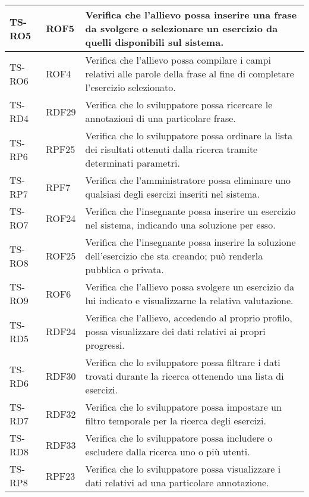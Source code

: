 \begin{longtable}{|>{\centering\arraybackslash}m{1.6cm}|>{\centering\arraybackslash}m{1.7cm}|m{6.41cm}|}
		\\ \hline
		\rowcolor{LightGray}
		TS-RO5		
		& ROF5 
		& Verifica che l'allievo possa inserire una frase da svolgere o selezionare un esercizio da quelli disponibili sul sistema.
		\\ \hline
		TS-RO6		
		& ROF4 
		& Verifica che l'allievo possa compilare i campi relativi alle parole della frase al fine di completare l'esercizio selezionato.
		\\ \hline
		\rowcolor{LightGray}
		TS-RD4		
		& RDF29
		& Verifica che lo sviluppatore possa ricercare le annotazioni di una particolare frase.
		\\ \hline
		TS-RP6		
		& RPF25 
		& Verifica che lo sviluppatore possa ordinare la lista dei risultati ottenuti dalla ricerca tramite determinati parametri. 
		\\ \hline
		\rowcolor{LightGray}
		TS-RP7		
		& RPF7 
		& Verifica che l'amministratore possa eliminare uno qualsiasi degli esercizi inseriti nel sistema.
		\\ \hline
		TS-RO7		
		& ROF24 
		& Verifica che l'insegnante possa inserire un esercizio nel sistema, indicando una soluzione per esso. 
		\\ \hline
		\rowcolor{LightGray}
		TS-RO8		
		& ROF25 
		& Verifica che l'insegnante possa inserire la soluzione dell'esercizio che sta creando; può renderla pubblica o privata. 
		\\ \hline
		TS-RO9		
		& ROF6 
		& Verifica che l'allievo possa svolgere un esercizio da lui indicato e visualizzarne la relativa valutazione. 
		\\ \hline
		\rowcolor{LightGray}
		TS-RD5		
		& RDF24 
		& Verifica che l'allievo, accedendo al proprio profilo, possa visualizzare dei dati relativi ai propri progressi. 
		\\ \hline
		TS-RD6		
		& RDF30 
		& Verifica che lo sviluppatore possa filtrare i dati trovati durante la ricerca ottenendo una lista di esercizi. 
		\\ \hline
		\rowcolor{LightGray}
		TS-RD7
		& RDF32 
		& Verifica che lo sviluppatore possa impostare un filtro temporale per la ricerca degli esercizi.
		\\ \hline
		TS-RD8		
		& RDF33 
		& Verifica che lo sviluppatore possa includere o escludere dalla ricerca uno o più utenti. 
		\\ \hline 
		\rowcolor{LightGray}
		TS-RP8		
		& RPF23 
		& Verifica che lo sviluppatore possa visualizzare i dati relativi ad una particolare annotazione. 		
		\\ \hline

\end{longtable}
